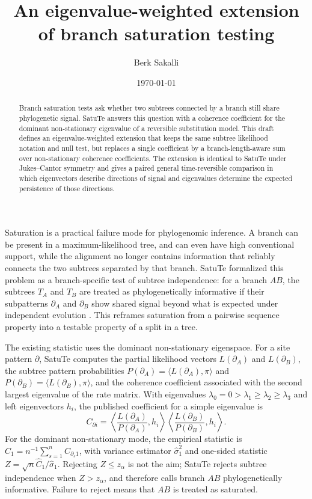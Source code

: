 \documentclass[11pt]{article}
\title{An eigenvalue-weighted extension of branch saturation testing}
\author{Berk Sakalli}
\date{\today}
\begin{document}
\maketitle

\begin{abstract}
Branch saturation tests ask whether two subtrees connected by a branch still share phylogenetic signal. SatuTe answers this question with a coherence coefficient for the dominant non-stationary eigenvalue of a reversible substitution model. This draft defines an eigenvalue-weighted extension that keeps the same subtree likelihood notation and null test, but replaces a single coefficient by a branch-length-aware sum over non-stationary coherence coefficients. The extension is identical to SatuTe under Jukes--Cantor symmetry and gives a paired general time-reversible comparison in which eigenvectors describe directions of signal and eigenvalues determine the expected persistence of those directions.
\end{abstract}

Saturation is a practical failure mode for phylogenomic inference. A branch can be present in a maximum-likelihood tree, and can even have high conventional support, while the alignment no longer contains information that reliably connects the two subtrees separated by that branch. SatuTe formalized this problem as a branch-specific test of subtree independence: for a branch \(AB\), the subtrees \(T_A\) and \(T_B\) are treated as phylogenetically informative if their subpatterns \(\partial_A\) and \(\partial_B\) show shared signal beyond what is expected under independent evolution \cite{manuel2025satute}. This reframes saturation from a pairwise sequence property into a testable property of a split in a tree.

The existing statistic uses the dominant non-stationary eigenspace. For a site pattern \(\partial\), SatuTe computes the partial likelihood vectors \(L(\partial_A)\) and \(L(\partial_B)\), the subtree pattern probabilities \(P(\partial_A)=\langle L(\partial_A),\pi\rangle\) and \(P(\partial_B)=\langle L(\partial_B),\pi\rangle\), and the coherence coefficient associated with the second largest eigenvalue of the rate matrix. With eigenvalues \(\lambda_0=0>\lambda_1\geq\lambda_2\geq\lambda_3\) and left eigenvectors \(h_i\), the published coefficient for a simple eigenvalue is
\begin{equation}
C_{\partial i}
=
\left\langle \frac{L(\partial_A)}{P(\partial_A)}, h_i \right\rangle
\left\langle \frac{L(\partial_B)}{P(\partial_B)}, h_i \right\rangle .
\label{eq-coherence}
\end{equation}
For the dominant non-stationary mode, the empirical statistic is \(\hat C_1=n^{-1}\sum_{s=1}^{n}C_{\partial_s 1}\), with variance estimator \(\hat\sigma_1^2\) and one-sided statistic \(Z=\sqrt{n}\hat C_1/\hat\sigma_1\). Rejecting \(Z\leq z_\alpha\) is not the aim; SatuTe rejects subtree independence when \(Z>z_\alpha\), and therefore calls branch \(AB\) phylogenetically informative. Failure to reject means that \(AB\) is treated as saturated.
\end{document}
